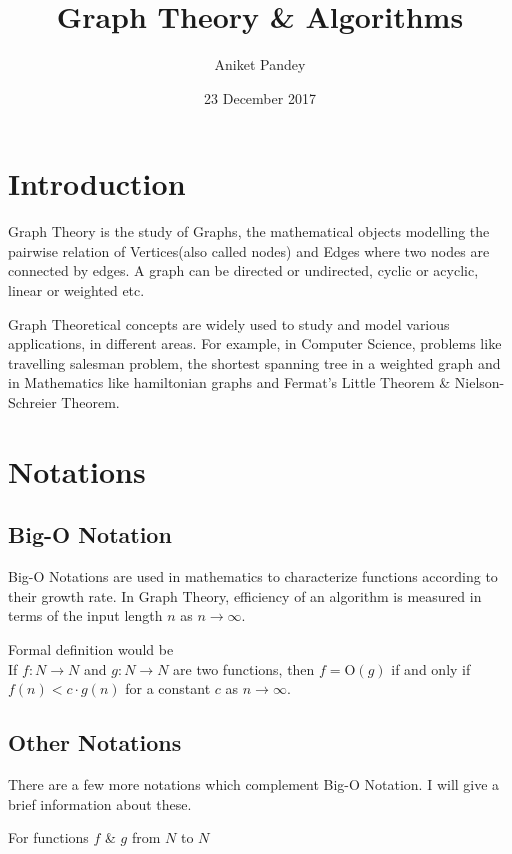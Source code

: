 \documentclass[12pt,a4paper]{extarticle}
\title{\textbf{Graph Theory \& Algorithms}}
\date{23 December 2017}
\author{Aniket Pandey}
\begin{document}
\maketitle


\section{Introduction}
Graph Theory is the study of Graphs, the mathematical objects modelling the pairwise relation of Vertices(also called nodes) and Edges where two nodes are connected by edges. A graph can be directed or undirected, cyclic or acyclic, linear or weighted etc. 

Graph Theoretical concepts are widely used to study and model various applications, in different areas. For example, in Computer Science, problems like travelling salesman problem, the shortest spanning tree in a weighted graph and in Mathematics like hamiltonian graphs and Fermat's Little Theorem \& Nielson-Schreier Theorem. 

\section{Notations}
\subsection{Big-O Notation}
Big-O Notations are used in mathematics to characterize functions according to their growth rate. In Graph Theory, efficiency of an algorithm is measured in terms of the input length $n$ as $n\rightarrow \infty $.\par Formal definition would be\\If $f:N\rightarrow N$ and $g:N\rightarrow N$ are two functions, then $f=$O$(g)$ if and only if $f(n)<c \cdot g(n)$ for a constant $c$ as $n\rightarrow\infty$.
\subsection{Other Notations}
There are a few more notations which complement Big-O Notation. I will give a brief information about these.\par
For functions $f$ \& $g$ from $N$ to $N$
\end{document}
